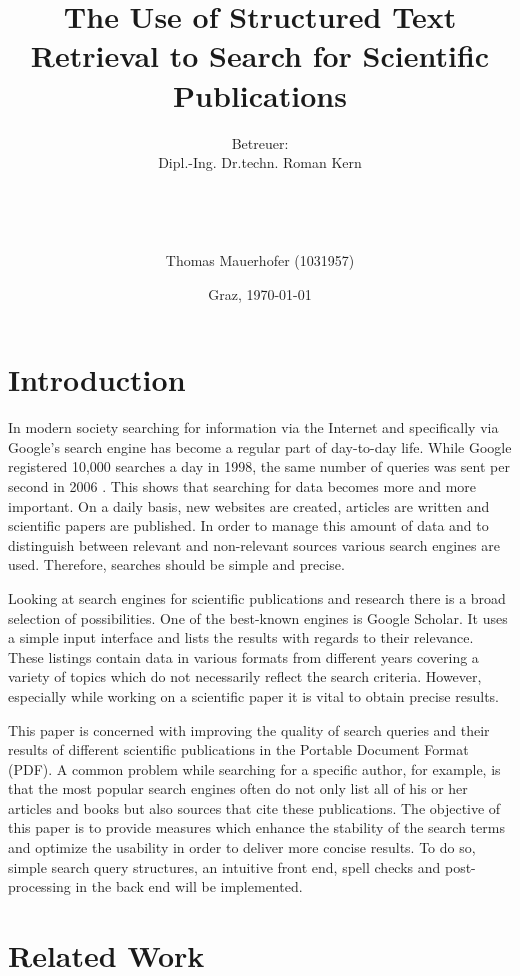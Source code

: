\documentclass[a4paper, 12pt]{scrartcl}
\title{The Use of Structured Text Retrieval to Search for Scientific Publications}
\author{Betreuer: \\
Dipl.-Ing. Dr.techn. Roman Kern \\ \\ \\ \\ \\
Thomas Mauerhofer (1031957)}
\date{Graz, \today{}}
\begin{document}
\maketitle
 
\newpage

\tableofcontents

\newpage

\section{Introduction}
\label{sec:Introduction}

In modern society searching for information via the Internet and specifically via Google's search engine has become a regular part of
day-to-day life. While Google registered 10,000 searches a day in 1998, the same number of queries was sent per second in 2006 \cite{Google}.
This shows that searching for data becomes more and more important. On a daily basis, new websites are created,
articles are written and scientific papers are published. In order to manage this amount of data and to distinguish between relevant and non-relevant
sources various search engines are used. Therefore, searches should be simple and precise.

Looking at search engines for scientific publications and research there is a broad selection of possibilities. One of the best-known engines is
Google Scholar. It uses a simple input interface and lists the results with regards to their relevance. These listings contain data
in various formats from different years covering a variety of topics which do not necessarily reflect the search criteria. However, especially
while working on a scientific paper it is vital to obtain precise results.

This paper is concerned with improving the quality of search queries and their results of different scientific publications in the Portable Document
Format (PDF). A common problem while searching for a specific author, for example, is that the most popular search engines often do not only list all of
his or her articles and books but also sources that cite these publications. The objective of this paper is to provide measures which enhance the stability of the search
terms and optimize the usability in order to deliver more concise results. To do so, simple search query structures, an intuitive front end, spell checks
and post-processing in the back end will be implemented.

\section{Related Work}
\end{document}
